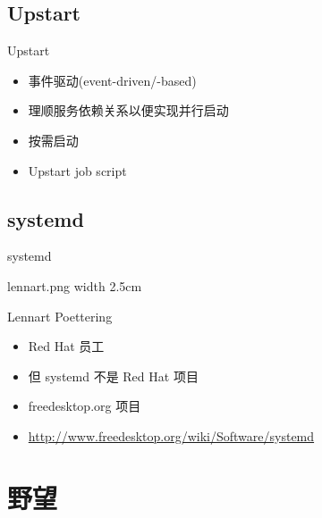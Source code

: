 \documentclass[CJK,xetex]{beamer}
\begin{document}
\subsection{Upstart}
\begin{frame}{Upstart}
\begin{itemize}[<+->]
\item 事件驱动(event-driven/-based)
\item 理顺服务依赖关系以便实现并行启动
\item 按需启动
\item Upstart job script
\end{itemize}
\end{frame}

\subsection{systemd}
\begin{frame}{systemd}
  \centerline{\XeTeXpicfile lennart.png width 2.5cm}
  \centerline{Lennart Poettering}
  \begin{itemize}[<+->]
  \item Red Hat 员工
  \item 但 systemd 不是 Red Hat 项目
  \item freedesktop.org 项目
  \item \url{http://www.freedesktop.org/wiki/Software/systemd}
  \end{itemize}
\end{frame}

\section{野望}
\end{document}
